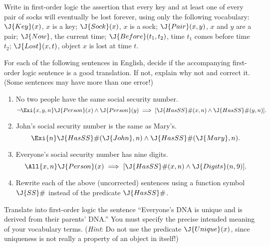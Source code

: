 \begin{exercise}
Write in first-order logic the assertion that every key and at least
one of every pair of socks will eventually be lost forever, using only
the following vocabulary: \(\J{Key}(x)\), \(x\) is a key; \(\J{Sock}(x)\),
\(x\) is a sock; \(\J{Pair}(x,y)\), \(x\) and \(y\) are a pair; \(\J{Now}\),
the current time; \(\J{Before}(t_1,t_2)\), time \(t_1\) comes before time
\(t_2\); \(\J{Lost}(x,t)\), object \(x\) is lost at time \(t\).
\end{exercise} 

\begin{uexercise}
For each of the following sentences in English, decide if the
accompanying first-order logic sentence is a good translation.
If not, explain why not and correct it. (Some sentences may have more than one error!)
\begin{enumerate}
\item No two people have the same social security number.
\[
  \lnot \Exi{x,y,n} \J{Person}(x) \land \J{Person}(y) \implies [\J{HasSS}\#(x,n) \land \J{HasSS}\#(y,n)].
\]

\item John's social security number is the same as Mary's.
\[
   \Exi{n} \J{HasSS}\#(\J{John},n) \land \J{HasSS}\#(\J{Mary},n).
\]
  
\item Everyone's social security number has nine digits.
\[
   \All{x,n} \J{Person}(x) \implies [\J{HasSS}\#(x,n) \land \J{Digits}(n,9)].
\]

\item Rewrite each of the above (uncorrected) sentences using 
a function symbol \(\J{SS}\#\) instead of the predicate \(\J{HasSS}\#\).
\end{enumerate}
\end{uexercise} 

\begin{iexercise}
Translate into first-order logic the sentence ``Everyone's DNA is unique
and is derived from their parents' DNA.''
You must specify the precise intended meaning of your vocabulary terms.
({\em Hint}: Do not use the predicate \(\J{Unique}(x)\), since uniqueness
is not really a property of an object in itself!)
\end{iexercise} 

